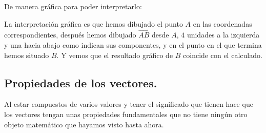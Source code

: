 \documentclass[a4paper,11pt,answers]{exam}
\begin{document}
\begin{questions}
\begin{solution}
    De manera gráfica para poder interpretarlo:
    \begin{center}
    \end{center}
  \end{solution}
  La interpretación gráfica es que hemos dibujado el punto $A$ en las coordenadas correspondientes,
  después hemos dibujado $\overrightarrow{AB}$ desde $A$, $4$ unidades a la izquierda y una
  hacia abajo como indican sus componentes, y en el punto en el que termina
  hemos situado $B$.
  Y vemos que el resultado gráfico de $B$ coincide con el calculado.
\end{questions}

\subsection{Propiedades de los vectores.} \label{propiedades_vectores}
Al estar compuestos de varios valores y tener el significado que tienen hace que los vectores
tengan unas propiedades fundamentales que no tiene ningún otro objeto matemático que hayamos
visto hasta ahora.\\
\end{document}
